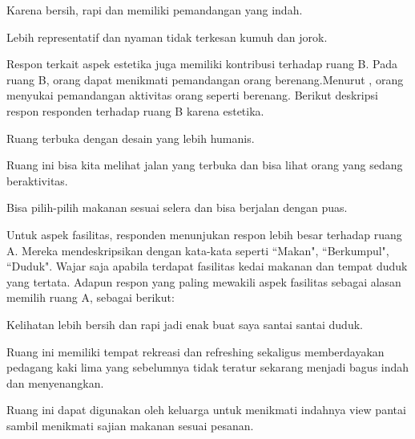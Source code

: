 \documentclass[11pt]{udthesis} %
\begin{document}
\begin{quoting}
    Karena bersih, rapi dan memiliki pemandangan yang indah.
\end{quoting}

\begin{quoting}
    Lebih representatif dan nyaman tidak terkesan kumuh dan jorok.
\end{quoting}

Respon terkait aspek estetika juga memiliki kontribusi terhadap ruang B. Pada ruang B, orang dapat menikmati pemandangan orang berenang.Menurut \cite{mumcu2016}, orang menyukai pemandangan aktivitas orang seperti berenang. Berikut deskripsi respon responden terhadap ruang B karena estetika.

\begin{quoting}
    Ruang terbuka dengan desain yang lebih humanis.
\end{quoting}

\begin{quoting}
    Ruang ini bisa kita melihat jalan yang terbuka dan bisa lihat orang yang sedang beraktivitas.
\end{quoting}

\begin{quoting}
    Bisa pilih-pilih makanan sesuai selera dan bisa berjalan dengan puas.
\end{quoting}

Untuk aspek fasilitas, responden menunjukan respon lebih besar terhadap ruang A. Mereka mendeskripsikan dengan kata-kata seperti ``Makan", ``Berkumpul", ``Duduk". Wajar saja apabila terdapat fasilitas kedai makanan dan tempat duduk yang tertata. Adapun respon yang paling mewakili aspek fasilitas sebagai alasan memilih ruang A, sebagai berikut:

\begin{quoting}
    Kelihatan lebih bersih dan rapi jadi enak buat saya santai santai duduk.
\end{quoting}

\begin{quoting}
    Ruang ini memiliki tempat rekreasi dan refreshing sekaligus memberdayakan pedagang kaki lima yang sebelumnya tidak teratur sekarang menjadi bagus indah dan menyenangkan.
\end{quoting}

\begin{quoting}
    Ruang ini dapat digunakan oleh keluarga untuk menikmati indahnya view pantai sambil menikmati sajian makanan sesuai pesanan.
\end{quoting}
\end{document}
